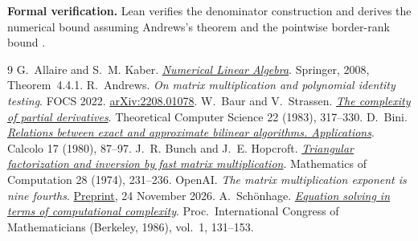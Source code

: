 \documentclass[11pt,letterpaper]{article}
\begin{document}
\medskip\noindent\textbf{Formal verification.}\enspace
Lean verifies the denominator construction and derives the numerical bound
assuming Andrews's theorem \cite[Theorem~3.4]{andrews} and the pointwise
border-rank bound \cite[Corollary~1.2]{openai}.

\begin{thebibliography}{9}
\small
\setlength{\itemsep}{0pt}
\setlength{\parsep}{0pt}
 G.~Allaire and S.~M. Kaber.
\href{https://doi.org/10.1007/978-0-387-68918-0}{\emph{Numerical Linear Algebra}}.
Springer, 2008, Theorem~4.4.1.
 R.~Andrews. \emph{On matrix multiplication and polynomial
identity testing}. FOCS 2022. \href{https://arxiv.org/abs/2208.01078}{arXiv:2208.01078}.
 W.~Baur and V.~Strassen.
\href{https://doi.org/10.1016/0304-3975(83)90110-X}{\emph{The complexity of partial derivatives}}.
Theoretical Computer Science 22 (1983), 317--330.
 D.~Bini. \href{https://doi.org/10.1007/BF02575865}{\emph{Relations between
exact and approximate bilinear algorithms. Applications}}. Calcolo 17 (1980), 87--97.
 J.~R. Bunch and J.~E. Hopcroft. \href{https://doi.org/10.1090/S0025-5718-1974-0331751-8}{\emph{Triangular factorization and inversion by fast matrix multiplication}}.
Mathematics of Computation 28 (1974), 231--236.
 OpenAI. \emph{The matrix multiplication exponent is nine fourths}.
\href{https://github.com/openai/math/blob/main/preprints/The-matrix-multiplication-exponent-is-nine-fourths-November-24-2026/paper.pdf}{Preprint}, 24 November 2026.
 A.~Sch\"onhage. \href{https://www.mathunion.org/fileadmin/ICM/Proceedings/ICM1986.1/ICM1986.1.ocr.pdf}{\emph{Equation solving in terms of computational complexity}}.
Proc.\ International Congress of Mathematicians (Berkeley, 1986), vol.~1, 131--153.
\end{thebibliography}
\end{document}
